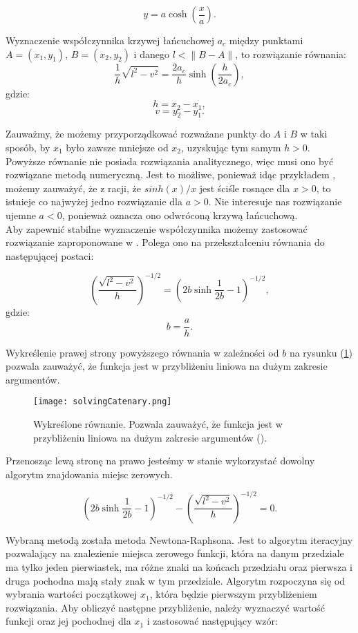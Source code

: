 \[
	y = a \cosh \left( \frac{x}{a} \right).
\]

Wyznaczenie współczynnika krzywej łańcuchowej $a_c$ między punktami $A = (x_1,y_1)$, $B = (x_2,y_2)$ i danego $l < \lVert B - A \rVert$, to rozwiązanie równania:
\[
	\frac{1}{h} \sqrt{l^2-v^2} = \frac{2a_c}{h} \sinh\left( \frac{h}{2a_c} \right),
\]
gdzie:
$$
h = x_2 - x_1,
$$
$$
v = y_2 - y_1.
$$

Zauważmy, że możemy przyporządkować rozważane punkty do $A$ i $B$ w taki sposób, by $x_1$ było zawsze mniejsze od $x_2$, uzyskując tym samym $h > 0$.
\\

Powyższe równanie nie posiada rozwiązania analitycznego, więc musi ono być rozwiązane metodą numeryczną. Jest to możliwe, ponieważ idąc przykładem \cite{Routh_2013}, możemy zauważyć, że z racji, że $sinh(x)/x$ jest ściśle rosnące dla $x>0$, to istnieje co najwyżej jedno rozwiązanie dla $a>0$. Nie interesuje nas rozwiązanie ujemne $a < 0$, ponieważ oznacza ono odwróconą krzywą łańcuchową. 
\\

Aby zapewnić stabilne wyznaczenie współczynnika możemy zastosować rozwiązanie zaproponowane w \cite{1002996}. Polega ono na przekształceniu równania do następującej postaci:

\[
	\left( \frac{\sqrt{l^2 - v^2}}{h} \right)^{-1/2} = \left( 2b\sinh\frac{1}{2b} - 1 \right)^{-1/2},
\]
gdzie:
$$
b = \frac{a}{h}.
$$

Wykreślenie prawej strony powyższego równania w zależności od $b$ na rysunku (\ref{solvingCatenary}) pozwala zauważyć, że funkcja jest w przybliżeniu liniowa na dużym zakresie argumentów.

\begin{figure}[h]
	\centering
	\texttt{[image: solvingCatenary.png]}
	\caption{Wykreślone równanie. Pozwala zauważyć, że funkcja jest w przybliżeniu liniowa na dużym zakresie argumentów (\cite{1002996}).}
	\label{solvingCatenary}
\end{figure}

Przenosząc lewą stronę na prawo jesteśmy w stanie wykorzystać dowolny algorytm znajdowania miejsc zerowych. 


\[
	\left( 2b\sinh\frac{1}{2b} - 1 \right)^{-1/2} - \left( \frac{\sqrt{l^2 - v^2}}{h} \right)^{-1/2} = 0.
\]

Wybraną metodą została metoda Newtona-Raphsona. Jest to algorytm iteracyjny pozwalający na znalezienie miejsca zerowego funkcji, która na danym przedziale ma tylko jeden pierwiastek, ma różne znaki na końcach przedziału oraz pierwsza i druga pochodna mają stały znak w tym przedziale. Algorytm rozpoczyna się od wybrania wartości początkowej $x_1$, która będzie pierwszym przybliżeniem rozwiązania. Aby obliczyć następne przybliżenie, należy wyznaczyć wartość funkcji oraz jej pochodnej dla $x_1$ i zastosować następujący wzór:

